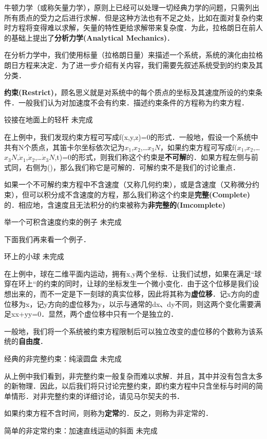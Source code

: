 
\begin{issues}
\issueDraft
\issueTODO
\end{issues}


牛顿力学（或称矢量力学），原则上已经可以处理一切经典力学的问题，只需列出所有质点的受力之后进行求解．但是这种方法也有不足之处，比如在面对复杂约束时方程将变得难以求解，矢量的特性更给求解带来复杂度．为此，拉格朗日在前人的基础上提出了\textbf{分析力学(Analytical Mechanics)}．

在分析力学中，我们使用标量（拉格朗日量）来描述一个系统，系统的演化由拉格朗日方程来决定．为了进一步介绍有关内容，我们需要先叙述系统受到的约束及其分类．

\textbf{约束(Restrict)}，顾名思义就是对系统中的每个质点的坐标及其速度所设的约束条件．一般我们认为对加速度不会有约束．描述约束条件的方程称为约束方程．

\begin{example}{铰接在地面上的轻杆}
未完成
\end{example}

在上例中，我们发现约束方程可写成f(x,y,z)=0的形式．一般地，假设一个系统中共有N个质点，其笛卡尔坐标依次记为$x
_1$,$x_2$,…$x_3N$，如果约束方程可写成f($x_1$,$x_2$,…$x_3N$,$\dot x_1$,$\dot x_2$,…$\dot x_3N$,t)=0的形式，则我们称这个约束是\textbf{不可解}的．如果方程左侧与前式同，右侧为()，那么我们称它是可解的．可解约束不是我们的讨论重点．

如果一个不可解约束方程中不含速度（又称几何约束），或是含速度（又称微分约束），但可以积分成不含速度的方程，那么我们称这个约束是\textbf{完整(Complete)}的．相应地，含速度且无法积分的约束被称为\textbf{非完整的(Imcomplete)}

\begin{example}{举一个可积含速度约束的例子}
未完成
\end{example}

下面我们再来看一个例子．

\begin{example}{环上的小球}
未完成
\end{example}

在上例中，球在二维平面内运动，拥有x,y两个坐标．让我们试想，如果在满足“球穿在环上“的约束的同时，让球的坐标发生一个微小变化．由于这个位移是我们设想出来的，而不一定是下一刻球的真实位移，因此将其称为\textbf{虚位移}．记x方向的虚位移为\delta x，记y方向的虚位移为\delta y，以示与通常的dx、dy不同，则这两个变化需要满足x\delta x+y\delta y=0．显然，两个虚位移中只有一个是独立的．

一般地，我们将一个系统被约束方程限制后可以独立改变的虚位移的个数称为该系统的\textbf{自由度}．

\begin{example}{经典的非完整约束：纯滚圆盘}
未完成
\end{example}

从上例中我们看到，非完整约束一般复杂而难以求解．并且，其中并没有包含太多的新物理．因此，以后我们将只讨论完整约束，即约束方程中只含坐标与时间的简单情形．对非完整约束的详细讨论，请见马尔契夫的书．

如果约束方程不含时间，则称为\textbf{定常}的．反之，则称为非定常的．

\begin{example}{简单的非定常约束：加速直线运动的斜面}
未完成
\end{example}
